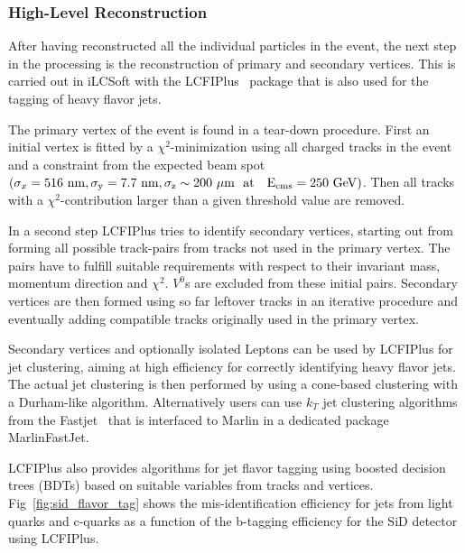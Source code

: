   

\subsubsection{High-Level Reconstruction}

After having reconstructed all the individual particles in the event, the next step in the processing is the reconstruction of
primary and secondary vertices. This is carried out in iLCSoft with the LCFIPlus~\cite{Suehara:2015ura} package that is also used
for the tagging of heavy flavor jets.

The primary vertex of the event is found in a tear-down procedure. First an initial vertex is fitted by a $\chi^2$-minimization using
all charged tracks in the event and a constraint from the expected beam spot
$(\sigma_x=516~\rm{nm}, \sigma_y=7.7~\rm{nm},\sigma_z \sim 200~\mu\rm{m}~~\rm{at}~~~E_{cms}=250~\rm{GeV})$.
Then all tracks with a $\chi^2$-contribution larger than a given threshold value are removed.

In a second step LCFIPlus tries to identify secondary vertices, starting out from forming all possible track-pairs from tracks not
used in the primary vertex. The pairs have to fulfill suitable requirements with respect to their invariant mass, momentum direction
and $\chi^2$. $V^0$s are excluded from these initial pairs. Secondary vertices are then formed using so far leftover tracks in
an iterative procedure and eventually adding compatible tracks originally used in the primary vertex.

Secondary vertices and optionally isolated Leptons can be used by LCFIPlus for jet clustering, aiming at high efficiency for correctly identifying
heavy flavor jets. The actual jet clustering is then performed by using a cone-based clustering with a Durham-like algorithm.
Alternatively users can use $k_T$ jet clustering algorithms from the Fastjet~\cite{Cacciari:2006sm} that is interfaced to Marlin in a dedicated
package MarlinFastJet.

LCFIPlus also provides algorithms for jet flavor tagging using boosted decision trees (BDTs) based on suitable variables from tracks and vertices.
Fig~\ref{fig:sid_flavor_tag} shows the mis-identification efficiency for jets from light quarks and c-quarks as a function of the b-tagging efficiency
for the SiD detector using LCFIPlus.

